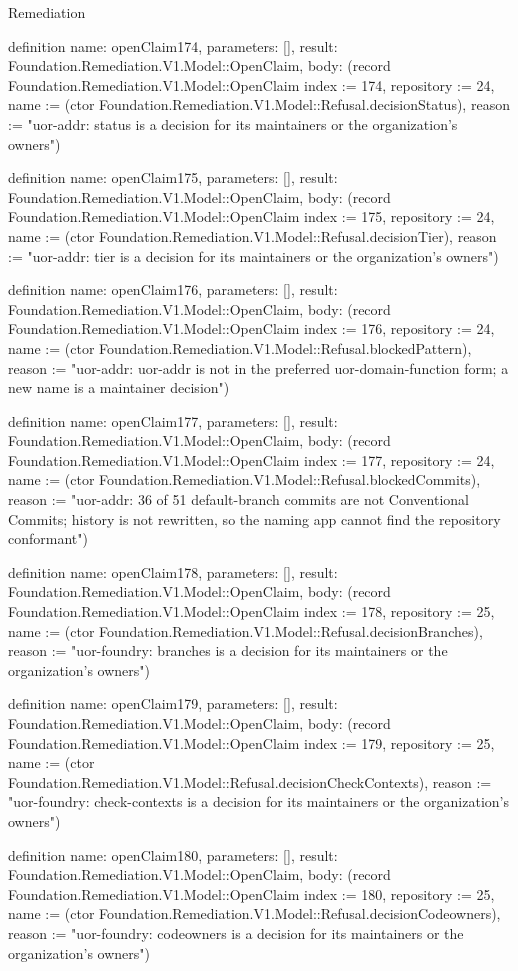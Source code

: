 \begin{lexlean}{Remediation}
\begin{semanticmodule}
definition{
  name: openClaim174,
  parameters: [],
  result: Foundation.Remediation.V1.Model::OpenClaim,
  body: (record Foundation.Remediation.V1.Model::OpenClaim {index := 174, repository := 24, name := (ctor Foundation.Remediation.V1.Model::Refusal.decisionStatus), reason := "uor-addr: status is a decision for its maintainers or the organization's owners"})
}

definition{
  name: openClaim175,
  parameters: [],
  result: Foundation.Remediation.V1.Model::OpenClaim,
  body: (record Foundation.Remediation.V1.Model::OpenClaim {index := 175, repository := 24, name := (ctor Foundation.Remediation.V1.Model::Refusal.decisionTier), reason := "uor-addr: tier is a decision for its maintainers or the organization's owners"})
}

definition{
  name: openClaim176,
  parameters: [],
  result: Foundation.Remediation.V1.Model::OpenClaim,
  body: (record Foundation.Remediation.V1.Model::OpenClaim {index := 176, repository := 24, name := (ctor Foundation.Remediation.V1.Model::Refusal.blockedPattern), reason := "uor-addr: uor-addr is not in the preferred uor-{domain}-{function} form; a new name is a maintainer decision"})
}

definition{
  name: openClaim177,
  parameters: [],
  result: Foundation.Remediation.V1.Model::OpenClaim,
  body: (record Foundation.Remediation.V1.Model::OpenClaim {index := 177, repository := 24, name := (ctor Foundation.Remediation.V1.Model::Refusal.blockedCommits), reason := "uor-addr: 36 of 51 default-branch commits are not Conventional Commits; history is not rewritten, so the naming app cannot find the repository conformant"})
}

definition{
  name: openClaim178,
  parameters: [],
  result: Foundation.Remediation.V1.Model::OpenClaim,
  body: (record Foundation.Remediation.V1.Model::OpenClaim {index := 178, repository := 25, name := (ctor Foundation.Remediation.V1.Model::Refusal.decisionBranches), reason := "uor-foundry: branches is a decision for its maintainers or the organization's owners"})
}

definition{
  name: openClaim179,
  parameters: [],
  result: Foundation.Remediation.V1.Model::OpenClaim,
  body: (record Foundation.Remediation.V1.Model::OpenClaim {index := 179, repository := 25, name := (ctor Foundation.Remediation.V1.Model::Refusal.decisionCheckContexts), reason := "uor-foundry: check-contexts is a decision for its maintainers or the organization's owners"})
}

definition{
  name: openClaim180,
  parameters: [],
  result: Foundation.Remediation.V1.Model::OpenClaim,
  body: (record Foundation.Remediation.V1.Model::OpenClaim {index := 180, repository := 25, name := (ctor Foundation.Remediation.V1.Model::Refusal.decisionCodeowners), reason := "uor-foundry: codeowners is a decision for its maintainers or the organization's owners"})
}


\end{semanticmodule}
\end{lexlean}

